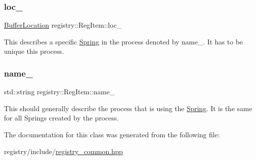 \subsubsection{\texorpdfstring{loc\+\_\+}{loc\_}}
{\footnotesize\ttfamily \hyperlink{structregistry_1_1BufferLocation}{Buffer\+Location} registry\+::\+Reg\+Item\+::loc\+\_\+\hspace{0.3cm}{\ttfamily [private]}}

This describes a specific \hyperlink{classSpring}{Spring} in the process denoted by name\+\_\+. It has to be unique this process. \mbox{\label{classregistry_1_1RegItem_a6e5945a427995b5f881403cd155b2a22}} 
\subsubsection{\texorpdfstring{name\+\_\+}{name\_}}
{\footnotesize\ttfamily std\+::string registry\+::\+Reg\+Item\+::name\+\_\+\hspace{0.3cm}{\ttfamily [private]}}

This should generally describe the process that is using the \hyperlink{classSpring}{Spring}. It is the same for all Springs created by the process. 

The documentation for this class was generated from the following file\+:\begin{DoxyCompactItemize}
\item 
registry/include/\hyperlink{registry__common_8hpp}{registry\+\_\+common.\+hpp}\end{DoxyCompactItemize}
